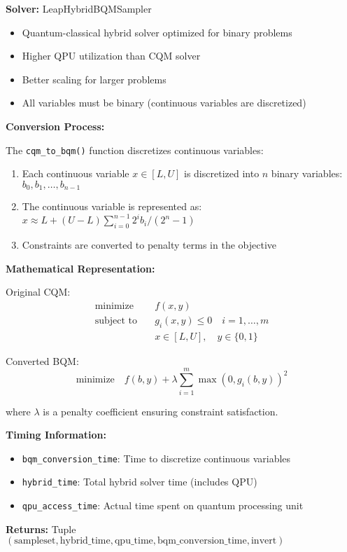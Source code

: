 \documentclass{article}
\begin{document}
\textbf{Solver:} LeapHybridBQMSampler
\begin{itemize}
    \item Quantum-classical hybrid solver optimized for binary problems
    \item Higher QPU utilization than CQM solver
    \item Better scaling for larger problems
    \item All variables must be binary (continuous variables are discretized)
\end{itemize}

\textbf{Conversion Process:}

The \texttt{cqm\_to\_bqm()} function discretizes continuous variables:
\begin{enumerate}
    \item Each continuous variable $x \in [L, U]$ is discretized into $n$ binary variables: $b_0, b_1, \ldots, b_{n-1}$
    \item The continuous variable is represented as: $x \approx L + (U - L) \sum_{i=0}^{n-1} 2^i b_i / (2^n - 1)$
    \item Constraints are converted to penalty terms in the objective
\end{enumerate}

\textbf{Mathematical Representation:}

Original CQM:
\begin{align*}
\text{minimize} \quad & f(x, y) \\
\text{subject to} \quad & g_i(x, y) \leq 0 \quad i = 1, \ldots, m \\
& x \in [L, U], \quad y \in \{0,1\}
\end{align*}

Converted BQM:
$$\text{minimize} \quad f(b, y) + \lambda \sum_{i=1}^m \max(0, g_i(b, y))^2$$

where $\lambda$ is a penalty coefficient ensuring constraint satisfaction.

\textbf{Timing Information:}
\begin{itemize}
    \item \texttt{bqm\_conversion\_time}: Time to discretize continuous variables
    \item \texttt{hybrid\_time}: Total hybrid solver time (includes QPU)
    \item \texttt{qpu\_access\_time}: Actual time spent on quantum processing unit
\end{itemize}

\textbf{Returns:} Tuple $(\text{sampleset}, \text{hybrid\_time}, \text{qpu\_time}, \text{bqm\_conversion\_time}, \text{invert})$
\end{document}
